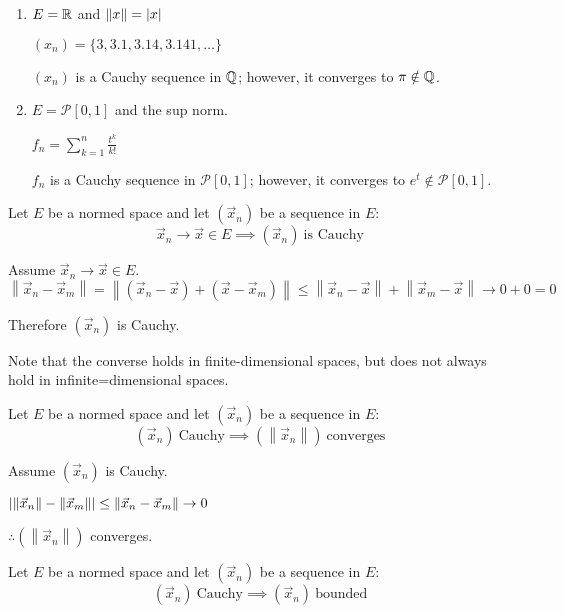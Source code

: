 \documentclass[letterpaper,12pt,fleqn]{article}
\newcommand{\vx}{\vec{x}}
\newcommand{\norm}[1]{\left\|#1\right\|}
\renewcommand{\mp}{\mathcal{P}}
\begin{document}
\newpage

\begin{examples}
  \listbreak
  \begin{enumerate}
  \item $E=\mathbb{R}$ and $\norm{x}=\abs{x}$

    $(x_n)=\{3, 3.1, 3.14, 3.141, \ldots\}$

    $(x_n)$ is a Cauchy sequence in $\mathbb{Q}$; however, it converges to
    $\pi\notin\mathbb{Q}$.

  \item $E=\mp[0,1]$ and the sup norm.

    $f_n=\sum_{k=1}^n\frac{t^k}{k!}$

    $f_n$ is a Cauchy sequence in $\mp[0,1]$; however, it converges to
    $e^t\notin\mp[0,1]$.
  \end{enumerate}
\end{examples}

\begin{theorem}
  Let $E$ be a normed space and let $(\vx_n)$ be a sequence in $E$:
  \[\vx_n\to\vx\in E\implies(\vx_n)\ \mbox{is Cauchy}\]
\end{theorem}

\begin{theproof}
  Assume $\vx_n\to\vx\in E$. \\
  $\norm{\vx_n-\vx_m}=\norm{(\vx_n-\vx)+(\vx-\vx_m)}\le
  \norm{\vx_n-\vx}+\norm{\vx_m-\vx}\to0+0=0$

  Therefore $(\vx_n)$ is Cauchy.
\end{theproof}

Note that the converse holds in finite-dimensional spaces, but does not always
hold in infinite=dimensional spaces.

\begin{theorem}
  Let $E$ be a normed space and let $(\vx_n)$ be a sequence in $E$:
  \[(\vx_n)\ \mbox{Cauchy}\implies(\norm{\vx_n})\ \mbox{converges}\]
\end{theorem}

\begin{theproof}
  Assume $(\vx_n)$ is Cauchy.

  $\abs{\norm{\vx_n}-\norm{\vx_m}}\le\norm{\vx_n-\vx_m}\to0$

  $\therefore(\norm{\vx_n})$ converges.
\end{theproof}

\begin{corollary}
  Let $E$ be a normed space and let $(\vx_n)$ be a sequence in $E$:
  \[(\vx_n)\ \mbox{Cauchy}\implies(\vx_n)\ \mbox{bounded}\]
\end{corollary}
\end{document}
